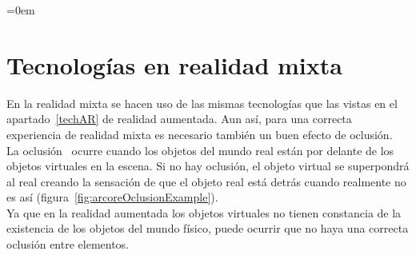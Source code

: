 \parindent=0em
\section{Tecnologías en realidad mixta}
\label{sec:oclusion}
\noindent

En la realidad mixta se hacen uso de las mismas tecnologías que las vistas en el apartado~\ref{techAR} de realidad aumentada. Aun así, para una correcta experiencia de realidad mixta es necesario también un buen efecto de oclusión.\\

La oclusión~\cite{oclussionExplanationEstadoDelArte} ocurre cuando los objetos del mundo real están por delante de los objetos virtuales en la escena. Si no hay oclusión, el objeto virtual se superpondrá al real creando la sensación de que el objeto real está detrás cuando realmente no es así (figura~\ref{fig:arcoreOclusionExample}).\\

Ya que en la realidad aumentada los objetos virtuales no tienen constancia de la existencia de los objetos del mundo físico, puede ocurrir que no haya una correcta oclusión entre elementos.\\

